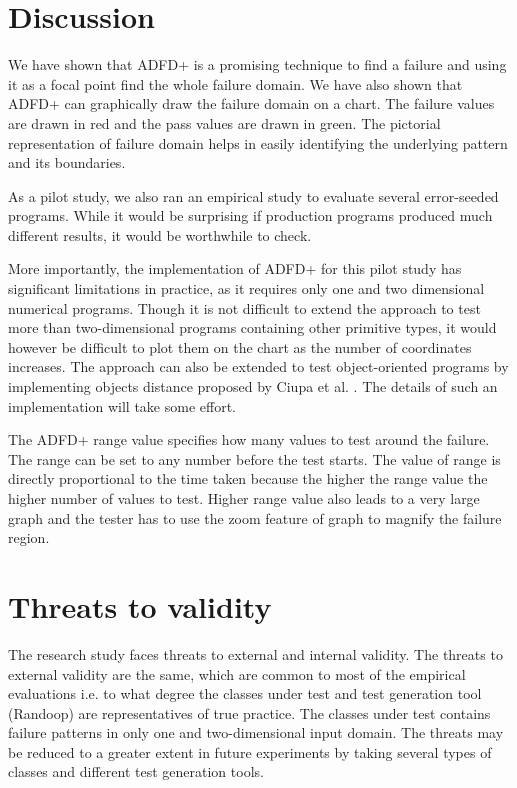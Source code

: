 





\section{Discussion}\label{sec:intro6_13}
We have shown that ADFD+ is a promising technique to find a failure and using it as a focal point find the whole failure domain. We have also shown that ADFD+ can graphically draw the failure domain on a chart. The failure values are drawn in red and the pass values are drawn in green. The pictorial representation of failure domain helps in easily identifying the underlying pattern and its boundaries.

As a pilot study, we also ran an empirical study to evaluate several error-seeded programs. While it would be surprising if production programs produced much different results, it would be worthwhile to check.

More importantly, the implementation of ADFD+ for this pilot study has significant limitations in practice, as it requires only one and two dimensional numerical programs. Though it is not difficult to extend the approach to test more than two-dimensional programs containing other primitive types, it would however be difficult to plot them on the chart as the number of coordinates increases. The approach can also be extended to test object-oriented programs by implementing objects distance proposed by Ciupa et al. \cite{ciupa2006object}. The details of such an implementation will take some effort.

The ADFD+ range value specifies how many values to test around the failure. The range can be set to any number before the test starts. The value of range is directly proportional to the time taken because the higher the range value the higher number of values to test. Higher range value also leads to a very large graph and the tester has to use the zoom feature of graph to magnify the failure region.




\section{Threats to validity}\label{sec:intro6_14}
The research study faces threats to external and internal validity. The threats to external validity are the same, which are common to most of the empirical evaluations i.e. to what degree the classes under test and test generation tool (Randoop) are representatives of true practice. The classes under test contains failure patterns in only one and two-dimensional input domain. The threats may be reduced to a greater extent in future experiments by taking several types of classes and different test generation tools. 

